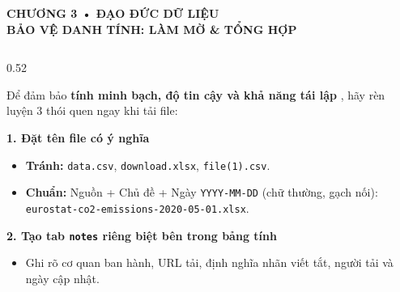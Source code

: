 \documentclass[aspectratio=169, 10pt]{beamer}
\newcommand{\slideheader}[2]{%
    \vspace*{-0.15cm}%
    {\fontsize{7.5pt}{9pt}\selectfont \textbf{\color{navyMuted}\MakeUppercase{#1}}}\\[0.03cm]
    {\fontsize{13.5pt}{16pt}\selectfont \textbf{\color{navyMain}\MakeUppercase{#2}}}\\[0.08cm]
}
\begin{document}
\begin{frame}[plain, t]
\slideheader{Chương 3 • Đạo Đức Dữ Liệu}{Bảo Vệ Danh Tính: Làm Mờ \& Tổng Hợp}
\begin{columns}[T]
\begin{column}{0.52\textwidth}
{\fontsize{8.2pt}{10.5pt}\selectfont
Để đảm bảo \textbf{tính minh bạch, độ tin cậy và khả năng tái lập }, hãy rèn luyện 3 thói quen ngay khi tải file:

\vspace{0.12cm}
\textbf{1. Đặt tên file có ý nghĩa}
\begin{itemize}\setlength{\itemsep}{1.5pt}
    \item \textcolor{accentRed}{\textbf{Tránh:}} \texttt{data.csv}, \texttt{download.xlsx}, \texttt{file(1).csv}.
    \item \textbf{Chuẩn:} Nguồn + Chủ đề + Ngày \texttt{YYYY-MM-DD} (chữ thường, gạch nối):\\ \texttt{eurostat-co2-emissions-2020-05-01.xlsx}.
\end{itemize}

\vspace{0.12cm}
\textbf{2. Tạo tab \texttt{notes} riêng biệt bên trong bảng tính}
\begin{itemize}\setlength{\itemsep}{1.5pt}
    \item Ghi rõ cơ quan ban hành, URL tải, định nghĩa nhãn viết tắt, người tải và ngày cập nhật.
\end{itemize}

}
\end{column}
\end{columns}
\end{frame}
\end{document}
